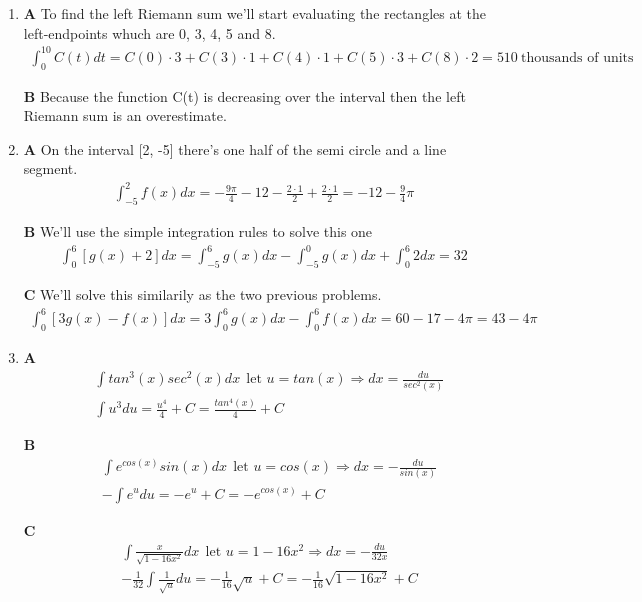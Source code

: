 \documentclass[13pt, a4paper, twoside]{article}
\begin{document}
\begin{enumerate}
\large \onehalfspacing

\item \textbf{A} To find the left Riemann sum we'll start evaluating the
rectangles at the left-endpoints whuch are 0, 3, 4, 5 and 8.
\begin{align*}
    \int^{10}_0 C(t) dt = C(0)\cdot 3 + C(3) \cdot 1 + C(4)\cdot 1 + C(5) \cdot 3 + C(8) \cdot 2 = 510\: \text{thousands of units}
\end{align*}

\textbf{B} Because the function C(t) is decreasing over the interval
then the left Riemann sum is an overestimate.

\item \textbf{A} On the interval [2, -5] there's one half of the semi circle
and a line segment.
\begin{align*}
    \int_{-5}^2 f(x) dx = -\frac{9\pi}{4} - 12 -  \frac{2\cdot 1}{2} + \frac{2\cdot 1}{2} = -12 - \frac{9}{4}\pi
\end{align*}

\textbf{B} We'll use the simple integration rules to solve this one 
\begin{align*}
    \int_0^6 [g(x)+2]dx = \int^6_{-5} g(x)dx - \int^0_{-5}g(x)dx + \int_0^6 2dx = 32
\end{align*}

\textbf{C} We'll solve this similarily as the two previous problems.
\begin{align*}
    \int_0^6 [3g(x) - f(x)]dx = 3\int_0^6 g(x)dx - \int_0^6 f(x)dx = 60 - 17 - 4\pi = 43 - 4\pi
\end{align*}

\item \textbf{A}
\begin{align*}
    &\int tan^3(x)sec^2(x)dx \: \: \text{let } u = tan(x) \Rightarrow dx = \frac{du}{sec^2(x)}\\
    &\int u^3 du = \frac{u^4}{4}+C =  \frac{tan^4(x)}{4}+C
\end{align*}

\textbf{B}
\begin{align*}
    &\int e^{cos(x)}sin(x) dx \: \: \text{let } u=cos(x) \Rightarrow dx = -\frac{du}{sin(x)}\\
    & -\int e^udu = -e^u + C = -e^{cos(x)} + C
\end{align*}

\textbf{C}
\begin{align*}
    &\int \frac{x}{\sqrt{1-16x^2}}dx \: \: \text{let } u = 1-16x^2 \Rightarrow dx = -\frac{du}{32x}\\
    &-\frac{1}{32}\int \frac{1}{\sqrt{u}}du = -\frac{1}{16} \sqrt{u} + C = -\frac{1}{16} \sqrt{1-16x^2} +C 
\end{align*}


\end{enumerate}
\end{document}
